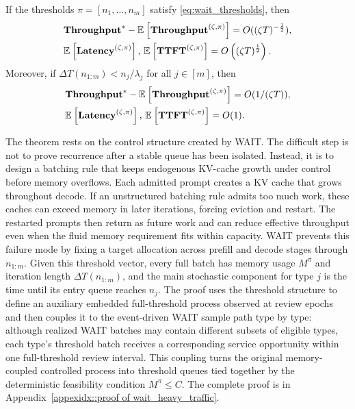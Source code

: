 \begin{theorem}
\label{thm:wait_heavy_traffic}
If the thresholds \(\pi=[n_1,\dots,n_m]\) satisfy \eqref{eq:wait_thresholds}, then
\[
\begin{aligned}
&\textbf{Throughput}^*-\mathbb{E}_{}\left[\textbf{Throughput}^{(\zeta,\pi)}\right]=O((\zeta T)^{-\frac{1}{2}}),\\
&\mathbb{E}_{}\left[\textbf{Latency}^{(\zeta,\pi)}\right],\,\mathbb{E}_{}\left[\textbf{TTFT}^{(\zeta,\pi)}\right]=O\left({(\zeta T)^{\frac{1}{2}}}\right).
\end{aligned}
\]
Moreover, if \(\Delta T(n_{1:m})<n_j/\lambda_j\) for all \(j\in[m]\), then
\[
\begin{aligned}
&\textbf{Throughput}^* - \mathbb{E}_{}\left[\textbf{Throughput}^{(\zeta,\pi)}\right] = O(1/(\zeta T)), \\
&\mathbb{E}_{}\left[\textbf{Latency}^{(\zeta,\pi)}\right],\, \mathbb{E}_{}\left[\textbf{TTFT}^{(\zeta,\pi)}\right] = O(1).
\end{aligned}
\]
\end{theorem}

The theorem rests on the control structure created by WAIT. The difficult step is not to prove recurrence after a stable queue has been isolated. Instead, it is to design a batching rule that keeps endogenous KV-cache growth under control before memory overflows. Each admitted prompt creates a KV cache that grows throughout decode. If an unstructured batching rule admits too much work, these caches can exceed memory in later iterations, forcing eviction and restart. The restarted prompts then return as future work and can reduce effective throughput even when the fluid memory requirement fits within capacity. WAIT prevents this failure mode by fixing a target allocation across prefill and decode stages through \(n_{1:m}\). Given this threshold vector, every full batch has memory usage \(M^\pi\) and iteration length \(\Delta T(n_{1:m})\), and the main stochastic component for type \(j\) is the time until its entry queue reaches \(n_j\). The proof uses the threshold structure to define an auxiliary embedded full-threshold process observed at review epochs and then couples it to the event-driven WAIT sample path type by type: although realized WAIT batches may contain different subsets of eligible types, each type's threshold batch receives a corresponding service opportunity within one full-threshold review interval. This coupling turns the original memory-coupled controlled process into threshold queues tied together by the deterministic feasibility condition \(M^\pi\le C\). The complete proof is in Appendix~\ref{appexidx::proof of wait_heavy_traffic}.

